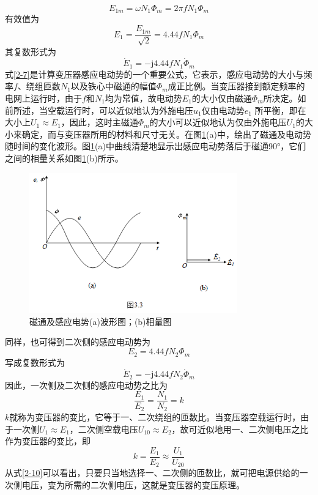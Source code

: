 \documentclass{book}
\begin{document}
\[{{E}_{1m}}=\omega {{N}_{1}}{{\Phi }_{m}}=2\pi f{{N}_{1}}{{\Phi }_{m}}\]
有效值为
\begin{equation}
{{E}_{1}}=\frac{{{E}_{1m}}}{\sqrt[{}]{2}}=4.44f{{N}_{1}}{{\Phi }_{m}}
\label{2-6}
\end{equation}
其复数形式为
\begin{equation}
{{\dot{E}}_{1}}=-\text{j}4.44f{{N}_{1}}{{\dot{\Phi }}_{m}}
\label{2-7}
\end{equation}
式\eqref{2-7}是计算变压器感应电动势的一个重要公式，它表示，感应电动势的大小与频率$f$、绕组匝数${{N}_{1}}$以及铁心中磁通的幅值${{\Phi }_{m}}$成正比例。当变压器接到额定频率的电网上运行时，由于$f$和${{N}_{1}}$均为常值，故电动势${{E}_{1}}$的大小仅由磁通${{\Phi }_{m}}$所决定。如前所述，当空载运行时，可以近似地认为外施电压${{u}_{1}}$仅由电动势${{e}_{1}}$ 所平衡，即在大小上${{U}_{1}}\approx {{E}_{1}}$，因此，这时主磁通${{\Phi }_{m}}$的大小可以近似地认为仅由外施电压${{U}_{1}}$的大小来确定，而与变压器所用的材料和尺寸无关。在图\ref{fig_3.3}(a)中，绘出了磁通及电动势随时间的变化波形。图\ref{fig_3.3}(a)中曲线清楚地显示出感应电动势落后于磁通90°，它们之间的相量关系如图\ref{fig_3.3}(b)所示。
\begin{figure}[H]
	\centering
	\includegraphics[width=0.80\textwidth]{3-3g.png}
	\caption{磁通及感应电势(a)波形图；(b)相量图}
	\label{fig_3.3}
\end{figure}
同样，也可得到二次侧的感应电动势为
\begin{equation}
{{E}_{2}}=4.44f{{N}_{2}}{{\Phi }_{m}}
\label{2-8}
\end{equation}
写成复数形式为
\begin{equation}
{{\dot{E}}_{2}}=-\text{j}4.44f{{N}_{2}}{{\dot{\Phi }}_{m}}
\label{2-9}
\end{equation}
因此，一次侧及二次侧的感应电动势之比为
\begin{equation}
\frac{{{E}_{1}}}{{{E}_{2}}}=\frac{{{N}_{1}}}{{{N}_{2}}}=k
\label{2-10}
\end{equation}
$k$就称为变压器的变比，它等于一、二次绕组的匝数比。当变压器空载运行时，由于一次侧${{U}_{1}}\approx {{E}_{1}}$，二次侧空载电压${{U}_{10}}\approx {{E}_{2}}$，故可近似地用一、二次侧电压之比作为变压器的变比，即
\begin{equation}
k=\frac{{{E}_{1}}}{{{E}_{2}}}\approx \frac{{{U}_{1}}}{{{U}_{20}}}
\label{2-11}
\end{equation}
从式\eqref{2-10}可以看出，只要只当地选择一、二次侧的匝数比，就可把电源供给的一次侧电压，变为所需的二次侧电压，这就是变压器的变压原理。
\end{document}
